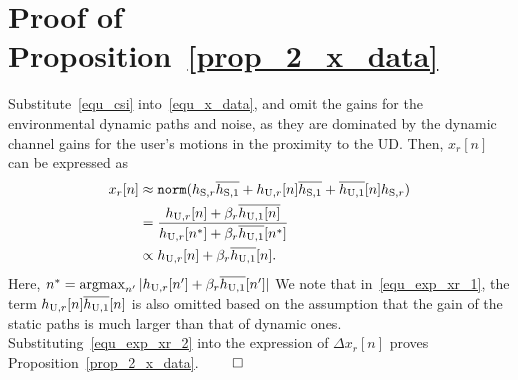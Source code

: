 \section{Proof of Proposition~\ref{prop_2_x_data}}
\label{proof_prop_2}

Substitute~\eqref{equ_csi} into~\eqref{equ_x_data}, and omit the gains for the environmental dynamic paths and noise, as they are dominated by the dynamic channel gains for the user's motions in the proximity to the UD.
Then, $x_{r}[n]$ can be expressed as
\begin{align}
\label{equ_exp_xr_1}
x_{r}[n]  &\approx\mathtt{norm}( h_{\mathrm{S},r}\overline{h_{\mathrm{S},1}} + h_{\mathrm{U},r}[n]\overline{h_{\mathrm{S},1}} + \overline{h_{\mathrm{U},1}}[n]h_{\mathrm{S},r})\\
\label{equ_exp_xr_2}
& = \frac{h_{\mathrm{U},r}[n]+\beta_r \overline{h_{\mathrm{U},1}[n]}}{h_{\mathrm{U},r}[n^*]+\beta_r \overline{h_{\mathrm{U},1}}[n^*]}\\
\label{equ_exp_xr_3}
& \propto h_{\mathrm{U},r}[n]+\beta_r \overline{h_{\mathrm{U},1}}[n].
\end{align}
Here, $n^* = \operatorname*{argmax}_{n'} |h_{\mathrm{U},r}[n']+\beta_r \overline{h_{\mathrm{U},1}}[n']|$
We note that in~\eqref{equ_exp_xr_1}, the term $h_{\mathrm{U},r}[n]\overline{h_{\mathrm{U},1}}[n]$ is also omitted based on the assumption that the gain of the static paths is much larger than that of dynamic ones.
Substituting~\eqref{equ_exp_xr_2} into the expression of $\Delta x_{r}[n]$ proves Proposition~\ref{prop_2_x_data}. \hfill $\qed$
